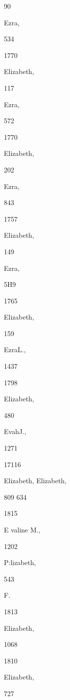 90 




Ezra, 


534 


1770 


Elizabeth, 


117 




Ezra, 


572 


1770 


Elizabeth, 


202 




Ezra, 


843 


1757 


Elizabeth, 


149 




Ezra, 


5H9 


1765 


Elizabeth, 


159 




EzraL., 


1437 


1798 


Elizabeth, 


480 




EvahJ., 


1271 


17116 


Elizabeth, 
Elizabeth, 


809 
634 


1815 


E valine M., 


1202 




P:lizabeth, 


543 




F. 




1813 


Elizabeth, 


1068 








1810 


Elizabeth, 


727 


